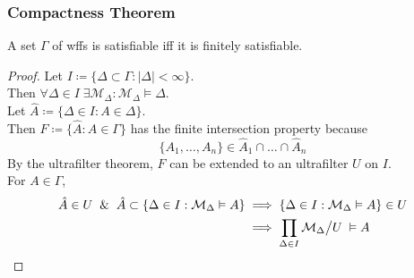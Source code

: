 \documentclass[UTF8,aspectratio=43,11pt,colorlinks,compress,openany]{beamer}%
\begin{document}
\begin{frame}\frametitle{Compactness Theorem}
\setlength\abovedisplayskip{0pt}
\setlength\belowdisplayskip{0pt}
	\begin{corollary}
		A set $\Gamma$ of wffs is satisfiable iff it is finitely satisfiable.
	\end{corollary}
	\begin{proof}
		Let $I\coloneqq \big\{\Delta\subset\Gamma: |\Delta|<\infty\big\}$.\\
		Then $\forall \Delta\in I\;\exists \mathcal{M}_\Delta: \mathcal{M}_\Delta\vDash\Delta$.\\
		Let $\hat{A}\coloneqq \{\Delta\in I: A\in\Delta\}$.\\
		Then $F\coloneqq \{\hat{A}: A\in\Gamma\}$ has the finite intersection property because
		\[\{A_1,\dots, A_n\}\in\hat{A}_1\cap\dots\cap\hat{A}_n\]
		By the ultrafilter theorem, $F$ can be extended to an ultrafilter $U$ on $I$.\\
		For $A\in\Gamma$,
		\begin{align*}
		\hat{A}\in U\;\;\&\;\;\hat{A}\subset\{\Delta\in I:\mathcal{M}_\Delta\vDash A\}&\implies\{\Delta\in I:\mathcal{M}_\Delta\vDash A\}\in U\\
		&\implies\prod\limits_{\Delta\in I}\mathcal{M}_\Delta\big\slash U\;\vDash A
		\end{align*}
	\end{proof}
\end{frame}
\end{document}
